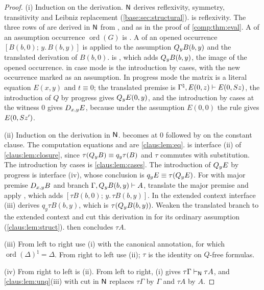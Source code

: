 \begin{proof}
(i) Induction on the derivation. $\mathsf{N}$ derives reflexivity, symmetry,
transitivity and Leibniz replacement (\cref{base:sec:structural}).
 is reflexivity. The three rows of  are
derived in $\mathsf{N}$ from ,  and  as in
the proof of \cref{comp:thm:eval}. A  of an
assumption occurrence $\operatorname{ord}(G)$ is . A  of
an opened occurrence $[B(b,0);\,y.\,B(b,y)]$ is  applied to the
assumption $Q_{y}B(b,y)$ and the translated derivation of $B(b,0)$.
 is , which adds $Q_{y}B(b,y)$, the image of the opened
occurrence.  in case mode is the introduction by cases,
with the new occurrence marked as an assumption. In progress mode the
matrix is a literal equation $E(x,y)$ and $t\equiv 0$; the translated
premise is $\Gamma^{\natural},E(0,z)\vdash E(0,S z)$, the introduction
of $Q$ by progress gives $Q_{y}E(0,y)$, and the introduction by cases at
the witness $0$ gives $D_{x,y}E$, because under the assumption $E(0,0)$
the rule  gives $E(0,S z')$.

(ii) Induction on the derivation in $\mathsf{N}$.  becomes  at
$0$ followed by  on the constant clause. The computation
equations and  are \cref{claus:lem:eq}.
 is interface (ii) of \cref{claus:lem:closure}, since
$\tau(Q_{y}B)\equiv q_y\tau(B)$ and $\tau$ commutes with substitution. The
introduction by cases is \cref{claus:lem:cases}. The introduction of
$Q_{y}E$ by progress is interface (iv), whose conclusion is
$q_yE\equiv\tau(Q_{y}E)$. For  with major premise $D_{x,y}B$ and branch
$\Gamma,Q_{y}B(b,y)\vdash A$, translate the major premise and apply
, which adds $[\tau B(b,0);\,y.\,\tau B(b,y)]$. In the
extended context interface (iii) derives $q_y\tau B(b,y)$, which is
$\tau(Q_{y}B(b,y))$. Weaken the translated branch to the extended context
and cut this derivation in for its ordinary assumption
(\cref{claus:lem:struct}).  then concludes $\tau A$.

(iii) From left to right use (i) with the canonical annotation, for which
$\operatorname{ord}(\Delta)^{\natural}=\Delta$. From right to left use (ii);
$\tau$ is the identity on $Q$-free formulas.

(iv) From right to left is (ii). From left to right, (i) gives
$\tau\Gamma\vdash_{\mathsf{N}}\tau A$, and \cref{claus:lem:unq}(iii) with cut in
$\mathsf{N}$ replaces $\tau\Gamma$ by $\Gamma$ and $\tau A$ by $A$.
\end{proof}

